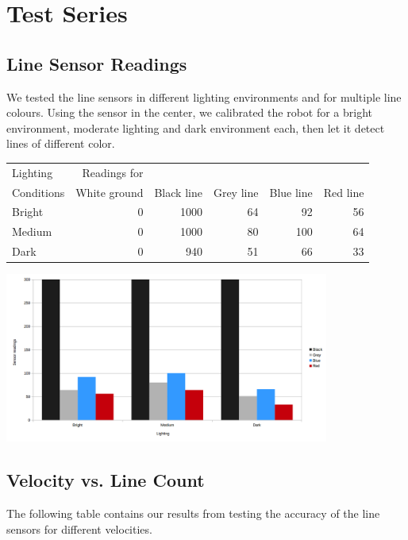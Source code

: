 \documentclass[12pt]{article}
\begin{document}
\lstset{language=C++}

\section*{Test Series}
\subsection*{Line Sensor Readings}
We tested the line sensors in different lighting environments and for multiple line colours.
Using the sensor in the center, we calibrated the robot for a bright environment, moderate lighting and dark environment each, then let it detect lines of different color.

\begin{tabular}{ | l || r | r | r | r | r | }
\hline
Lighting & Readings for & & & & \\
Conditions & White ground & Black line & Grey line & Blue line & Red line \\ \hline
Bright & 0 & 1000 & 64 & 92 & 56\\ \hline
Medium & 0 & 1000 & 80 & 100 & 64\\ \hline
Dark & 0 & 940 & 51 & 66 & 33\\
\hline
\end{tabular}

\begin{center}

\includegraphics[width = 0.8\textwidth]{images/chart_brightness.png}

\end{center}

\subsection*{Velocity vs. Line Count}
The following table contains our results from testing the accuracy of the line sensors for different velocities.
\end{document}
